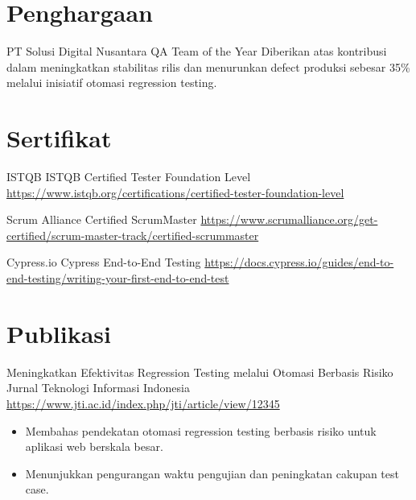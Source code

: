 \documentclass[a4paper, serif, 10pt]{moderncv}
\begin{document}
\section{Penghargaan}

        {PT Solusi Digital Nusantara}
        {QA Team of the Year}
        {}
        {}
        {Diberikan atas kontribusi dalam meningkatkan stabilitas rilis dan menurunkan defect produksi sebesar 35\% melalui inisiatif otomasi regression testing.}
\section{Sertifikat}

        {ISTQB}
        {ISTQB Certified Tester Foundation Level}
        {\url{https://www.istqb.org/certifications/certified-tester-foundation-level}}
        {}
        {}

        {Scrum Alliance}
        {Certified ScrumMaster}
        {\url{https://www.scrumalliance.org/get-certified/scrum-master-track/certified-scrummaster}}
        {}
        {}

        {Cypress.io}
        {Cypress End-to-End Testing}
        {\url{https://docs.cypress.io/guides/end-to-end-testing/writing-your-first-end-to-end-test}}
        {}
        {}
\section{Publikasi}

        {Meningkatkan Efektivitas Regression Testing melalui Otomasi Berbasis Risiko}
        {Jurnal Teknologi Informasi Indonesia}
        {\url{https://www.jti.ac.id/index.php/jti/article/view/12345}}
        {}
        {\begin{itemize}
\item Membahas pendekatan otomasi regression testing berbasis risiko untuk aplikasi web berskala besar.
\item Menunjukkan pengurangan waktu pengujian dan peningkatan cakupan test case.
\end{itemize}}
\end{document}
